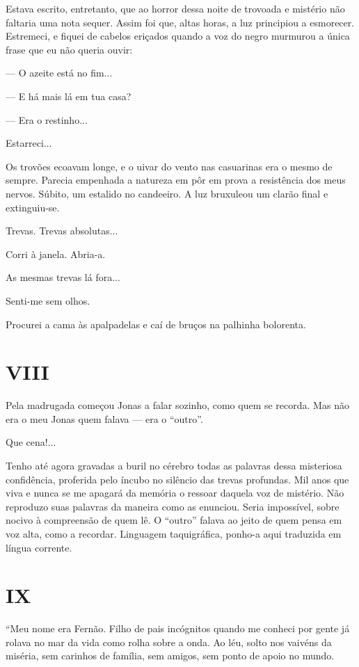 Estava escrito, entretanto, que ao horror dessa noite de trovoada e
mistério não faltaria uma nota sequer. Assim foi que, altas horas, a luz
principiou a esmorecer. Estremeci, e fiquei de cabelos eriçados quando a
voz do negro murmurou a única frase que eu não queria ouvir:

--- O azeite está no fim...

--- E há mais lá em tua casa?

--- Era o restinho...

Estarreci...

Os trovões ecoavam longe, e o uivar do vento nas casuarinas era o mesmo
de sempre. Parecia empenhada a natureza em pôr em prova a resistência
dos meus nervos. Súbito, um estalido no candeeiro. A luz bruxuleou um
clarão final e extinguiu-se.

Trevas. Trevas absolutas...

Corri à janela. Abria-a.

As mesmas trevas lá fora...

Senti-me sem olhos.

Procurei a cama às apalpadelas e caí de bruços na palhinha bolorenta.

\section{VIII}

Pela madrugada começou Jonas a falar sozinho, como quem se recorda. Mas
não era o meu Jonas quem falava --- era o ``outro''.

Que cena!...

Tenho até agora gravadas a buril no cérebro todas as palavras dessa
misteriosa confidência, proferida pelo íncubo no silêncio das trevas
profundas. Mil anos que viva e nunca se me apagará da memória o ressoar
daquela voz de mistério. Não reproduzo suas palavras da maneira como as
enunciou. Seria impossível, sobre nocivo à compreensão de quem lê. O
``outro'' falava ao jeito de quem pensa em voz alta, como a recordar.
Linguagem taquigráfica, ponho-a aqui traduzida em língua corrente.

\section{IX}

``Meu nome era Fernão. Filho de pais incógnitos quando me conheci por
gente já rolava no mar da vida como rolha sobre a onda. Ao léu, solto
nos vaivéns da miséria, sem carinhos de família, sem amigos, sem ponto
de apoio no mundo.

